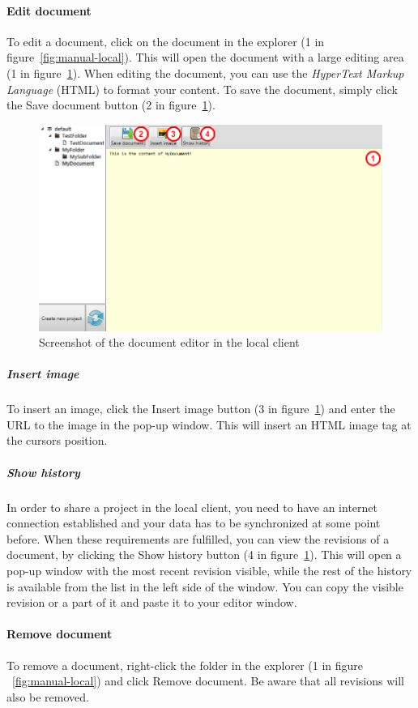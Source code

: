 	\paragraph{Edit document}
	To edit a document, click on the document in the explorer (1 in figure~\ref{fig:manual-local}). This will open the document with a large editing area (1 in figure~\ref{fig:manual-local-document}). When editing the document, you can use the \emph{HyperText Markup Language}\cite{w3cHTML} (HTML) to format your content. To save the document, simply click the Save document button (2 in figure~\ref{fig:manual-local-document}).
	
	\begin{figure}[htb]
		\centering
		\includegraphics[width=1\textwidth]{User_manual/graphics/local-document.png}
		\caption{Screenshot of the document editor in the local client}
		\label{fig:manual-local-document}
	\end{figure}
	
		\subparagraph{Insert image}
		To insert an image, click the Insert image button (3 in figure~\ref{fig:manual-local-document}) and enter the URL to the image in the pop-up window. This will insert an HTML image tag at the cursors position.
		
		\subparagraph{Show history}
		In order to share a project in the local client, you need to have an internet connection established and your data
    has to be synchronized at some point before. When these requirements are fulfilled, you can view the revisions of a document, by clicking the Show history button (4 in figure~\ref{fig:manual-local-document}). This will open a pop-up window with the most recent revision visible, while the rest of the history is available from the list in the left side of the window. You can copy the visible revision or a part of it and paste it to your editor window.
	
	\paragraph{Remove document}
	To remove a document, right-click the folder in the explorer (1 in figure ~\ref{fig:manual-local}) and click Remove document. Be aware that all revisions will also be removed.
